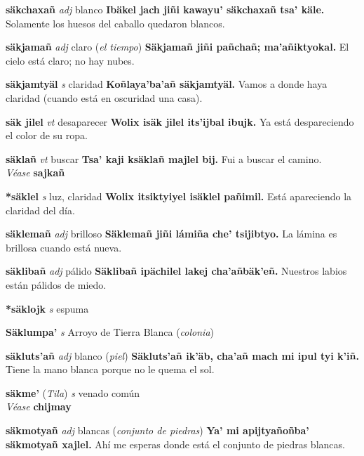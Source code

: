 \documentclass[10pt]{scrbook}
\newcommand{\entry}[1]{\textbf{#1}}
\newcommand{\partofspeech}[1]{\textit{#1}}
\newcommand{\spanishtranslation}[1]{#1}
\newcommand{\clarification}[1]{(\textit{#1})}
\newcommand{\cholexample}[1]{\textbf{#1}}
\newcommand{\exampletranslation}[1]{#1}
\newcommand{\alsosee}[1]{\\\textit{Véase} \textbf{#1}}
\newcommand{\relevantdialect}[1]{(\textit{#1})}
\begin{document}
\begin{multicols}{2}
\entry{säkchaxañ}
\partofspeech{adj}
\spanishtranslation{blanco}
\cholexample{Ibäkel jach jiñi kawayu' säkchaxañ tsa' käle.}
\exampletranslation{Solamente los huesos del caballo quedaron blancos.}

\entry{säkjamañ}
\partofspeech{adj}
\spanishtranslation{claro}
\clarification{el tiempo}
\cholexample{Säkjamañ jiñi pañchañ; ma'añiktyokal.}
\exampletranslation{El cielo está claro; no hay nubes.}

\entry{säkjamtyäl}
\partofspeech{s}
\spanishtranslation{claridad}
\cholexample{Koñlaya'ba'añ säkjamtyäl.}
\exampletranslation{Vamos a donde haya claridad (cuando está en oscuridad una casa).}

\entry{säk jilel}
\partofspeech{vt}
\spanishtranslation{desaparecer}
\cholexample{Wolix isäk jilel its'ijbal ibujk.}
\exampletranslation{Ya está despareciendo el color de su ropa.}

\entry{säklañ}
\partofspeech{vt}
\spanishtranslation{buscar}
\cholexample{Tsa' kaji ksäklañ majlel bij.}
\exampletranslation{Fui a buscar el camino.}
\alsosee{sajkañ}

\entry{*säklel}
\partofspeech{s}
\spanishtranslation{luz, claridad}
\cholexample{Wolix itsiktyiyel isäklel pañimil.}
\exampletranslation{Está apareciendo la claridad del día.}

\entry{säklemañ}
\partofspeech{adj}
\spanishtranslation{brilloso}
\cholexample{Säklemañ jiñi lámiña che' tsijibtyo.}
\exampletranslation{La lámina es brillosa cuando está nueva.}

\entry{säklibañ}
\partofspeech{adj}
\spanishtranslation{pálido}
\cholexample{Säklibañ ipächilel lakej cha'añbäk'eñ.}
\exampletranslation{Nuestros labios están pálidos de miedo.}

\entry{*säklojk}
\partofspeech{s}
\spanishtranslation{espuma}

\entry{Säklumpa'}
\partofspeech{s}
\spanishtranslation{Arroyo de Tierra Blanca}
\clarification{colonia}

\entry{säkluts'añ}
\partofspeech{adj}
\spanishtranslation{blanco}
\clarification{piel}
\cholexample{Säkluts'añ ik'äb, cha'añ mach mi ipul tyi k'iñ.}
\exampletranslation{Tiene la mano blanca porque no le quema el sol.}

\entry{säkme'}
\relevantdialect{Tila}
\partofspeech{s}
\spanishtranslation{venado común}
\alsosee{chijmay}

\entry{säkmotyañ}
\partofspeech{adj}
\spanishtranslation{blancas}
\clarification{conjunto de piedras}
\cholexample{Ya' mi apijtyañoñba' säkmotyañ xajlel.}
\exampletranslation{Ahí me esperas donde está el conjunto de piedras blancas.}


\end{multicols}
\end{document}
